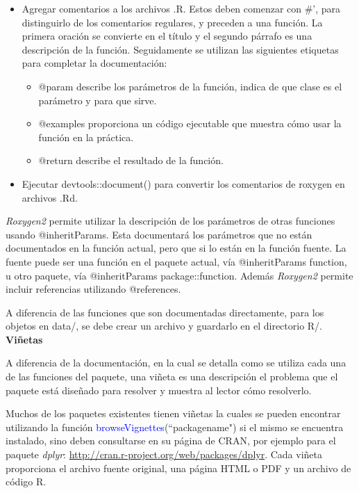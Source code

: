 \begin{itemize}
\item Agregar comentarios a los archivos .R. Estos deben comenzar con \#', para distinguirlo de los comentarios regulares, y preceden a una función. La primera oración se convierte en el título y el segundo párrafo es una descripción de la función. Seguidamente se utilizan las siguientes etiquetas para completar la documentación:

\begin{itemize}
\item @param describe los parámetros de la función, indica de que clase es el parámetro y para que sirve.
\item @examples proporciona un código ejecutable que muestra cómo usar la función en la práctica. 
\item @return describe el resultado de la función. 
\end{itemize}

\item Ejecutar devtools::document() para convertir los comentarios de roxygen en archivos .Rd. 
\end{itemize}

\emph{Roxygen2} permite utilizar la descripción de los parámetros de otras funciones usando @inheritParams. Esta documentará los parámetros que no están documentados en la función actual, pero que si lo están en la función fuente. La fuente puede ser una función en el paquete actual, vía @inheritParams function, u otro paquete, vía @inheritParams package::function. Además \emph{Roxygen2} permite incluir referencias utilizando @references.

A diferencia de las funciones que son documentadas directamente, para los objetos en data/, se debe crear un archivo y guardarlo en el directorio R/.\\

\textbf{Viñetas}

A diferencia de la documentación, en la cual se detalla como se utiliza cada una de las funciones del paquete, una viñeta es una descripción el problema que el paquete está diseñado para resolver y muestra al lector cómo resolverlo.

Muchos de los paquetes existentes tienen viñetas la cuales se pueden encontrar utilizando la función \textcolor{blue}{browseVignettes}(``packagename") si el mismo se encuentra instalado, sino deben consultarse en su página de CRAN, por ejemplo para el paquete \emph{dplyr}: \url{http://cran.r-project.org/web/packages/dplyr}. Cada viñeta proporciona el archivo fuente original, una página HTML o PDF y un archivo de código R. 

